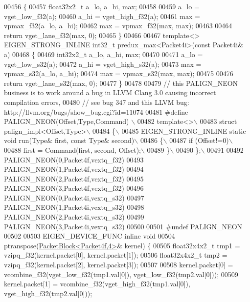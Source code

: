 \begin{DoxyCode}
{{00456 \{
00457   float32x2\_t a\_lo, a\_hi, max;
00458 
00459   a\_lo = vget\_low\_f32(a);
00460   a\_hi = vget\_high\_f32(a);
00461   max = vpmax\_f32(a\_lo, a\_hi);
00462   max = vpmax\_f32(max, max);
00463 
00464   \textcolor{keywordflow}{return} vget\_lane\_f32(max, 0);
00465 \}
00466 
00467 \textcolor{keyword}{template}<> EIGEN\_STRONG\_INLINE int32\_t predux\_max<Packet4i>(\textcolor{keyword}{const} Packet4i& a)
00468 \{
00469   int32x2\_t a\_lo, a\_hi, max;
00470 
00471   a\_lo = vget\_low\_s32(a);
00472   a\_hi = vget\_high\_s32(a);
00473   max = vpmax\_s32(a\_lo, a\_hi);
00474   max = vpmax\_s32(max, max);
00475 
00476   \textcolor{keywordflow}{return} vget\_lane\_s32(max, 0);
00477 \}
00478 
00479 \textcolor{comment}{// this PALIGN\_NEON business is to work around a bug in LLVM Clang 3.0 causing incorrect compilation
       errors,}
00480 \textcolor{comment}{// see bug 347 and this LLVM bug: http://llvm.org/bugs/show\_bug.cgi?id=11074}
00481 \textcolor{preprocessor}{#define PALIGN\_NEON(Offset,Type,Command) \(\backslash\)}
00482 \textcolor{preprocessor}{template<>\(\backslash\)}
00483 \textcolor{preprocessor}{struct palign\_impl<Offset,Type>\(\backslash\)}
00484 \textcolor{preprocessor}{\{\(\backslash\)}
00485 \textcolor{preprocessor}{    EIGEN\_STRONG\_INLINE static void run(Type& first, const Type& second)\(\backslash\)}
00486 \textcolor{preprocessor}{    \{\(\backslash\)}
00487 \textcolor{preprocessor}{        if (Offset!=0)\(\backslash\)}
00488 \textcolor{preprocessor}{            first = Command(first, second, Offset);\(\backslash\)}
00489 \textcolor{preprocessor}{    \}\(\backslash\)}
00490 \textcolor{preprocessor}{\};\(\backslash\)}
00491 \textcolor{preprocessor}{}
00492 PALIGN\_NEON(0,Packet4f,vextq\_f32)
00493 PALIGN\_NEON(1,Packet4f,vextq\_f32)
00494 PALIGN\_NEON(2,Packet4f,vextq\_f32)
00495 PALIGN\_NEON(3,Packet4f,vextq\_f32)
00496 PALIGN\_NEON(0,Packet4i,vextq\_s32)
00497 PALIGN\_NEON(1,Packet4i,vextq\_s32)
00498 PALIGN\_NEON(2,Packet4i,vextq\_s32)
00499 PALIGN\_NEON(3,Packet4i,vextq\_s32)
00500 
00501 \textcolor{preprocessor}{#undef PALIGN\_NEON}
00502 
00503 EIGEN\_DEVICE\_FUNC \textcolor{keyword}{inline} \textcolor{keywordtype}{void}
00504 ptranspose(\hyperlink{struct_eigen_1_1internal_1_1_packet_block}{PacketBlock<Packet4f,4>}& kernel) \{
00505   float32x4x2\_t tmp1 = vzipq\_f32(kernel.packet[0], kernel.packet[1]);
00506   float32x4x2\_t tmp2 = vzipq\_f32(kernel.packet[2], kernel.packet[3]);
00507 
00508   kernel.packet[0] = vcombine\_f32(vget\_low\_f32(tmp1.val[0]), vget\_low\_f32(tmp2.val[0]));
00509   kernel.packet[1] = vcombine\_f32(vget\_high\_f32(tmp1.val[0]), vget\_high\_f32(tmp2.val[0]));
}}
\end{DoxyCode}
